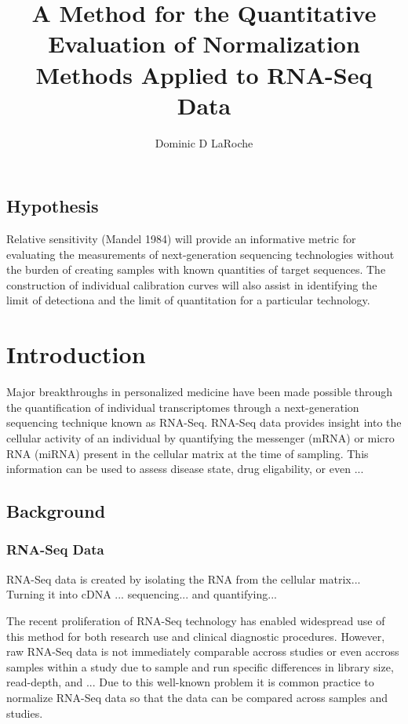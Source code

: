 \documentclass{book}\usepackage[]{graphicx}\usepackage[]{color}
\title{A Method for the Quantitative Evaluation of Normalization Methods Applied to RNA-Seq Data}
\author{Dominic D LaRoche}
\begin{document}
\maketitle
\tableofcontents

\newpage

\section{Hypothesis}
Relative sensitivity (Mandel 1984) will provide an informative metric for evaluating the measurements of next-generation sequencing technologies without the burden of creating samples with known quantities of target sequences.  The construction of individual calibration curves will also assist in identifying the limit of detectiona and the limit of quantitation for a particular technology.

\chapter{Introduction}

Major breakthroughs in personalized medicine have been made possible through the quantification of individual transcriptomes through a next-generation sequencing technique known as RNA-Seq.  RNA-Seq data provides insight into the cellular activity of an individual by quantifying the messenger (mRNA) or micro RNA (miRNA) present in the cellular matrix at the time of sampling.  This information can be used to assess disease state, drug eligability, or even ...




\section{Background}
\subsection{RNA-Seq Data}

RNA-Seq data is created by isolating the RNA from the cellular matrix... Turning it into cDNA ... sequencing... and quantifying...

The recent proliferation of RNA-Seq technology has enabled widespread use of this method for both research use and clinical diagnostic procedures.  However, raw RNA-Seq data is not immediately comparable accross studies or even accross samples within a study due to sample and run specific differences in library size, read-depth, and ...  Due to this well-known problem it is common practice to normalize RNA-Seq data so that the data can be compared across samples and studies.  
\end{document}

